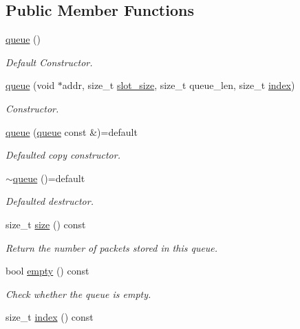 \subsection*{Public Member Functions}
\begin{DoxyCompactItemize}
\item 
\hyperlink{classpfq_1_1queue_a9cae048d6400df0d922d72abaf7b6ed4}{queue} ()
\begin{DoxyCompactList}\small\item\em Default Constructor. \end{DoxyCompactList}\item 
\hyperlink{classpfq_1_1queue_ae22b5277f726ea9b39a4088128d3cc38}{queue} (void $\ast$addr, size\+\_\+t \hyperlink{classpfq_1_1queue_aa8ec2b1bd7c4fb2ec924f356c95b81ae}{slot\+\_\+size}, size\+\_\+t queue\+\_\+len, size\+\_\+t \hyperlink{classpfq_1_1queue_a6eec9332ce5248055b03376855469087}{index})
\begin{DoxyCompactList}\small\item\em Constructor. \end{DoxyCompactList}\item 
\hyperlink{classpfq_1_1queue_a63fb6cb036b494997edceace28b4dfac}{queue} (\hyperlink{classpfq_1_1queue}{queue} const \&)=default
\begin{DoxyCompactList}\small\item\em Defaulted copy constructor. \end{DoxyCompactList}\item 
\hyperlink{classpfq_1_1queue_a2605dcaac04245b5316262a4cf7cd1c0}{$\sim$queue} ()=default
\begin{DoxyCompactList}\small\item\em Defaulted destructor. \end{DoxyCompactList}\item 
size\+\_\+t \hyperlink{classpfq_1_1queue_a367fd68b05da07a1d95f91b8d2ae9990}{size} () const 
\begin{DoxyCompactList}\small\item\em Return the number of packets stored in this queue. \end{DoxyCompactList}\item 
bool \hyperlink{classpfq_1_1queue_ade52977341756f260e8e9f18c0b7b5c5}{empty} () const 
\begin{DoxyCompactList}\small\item\em Check whether the queue is empty. \end{DoxyCompactList}\item 
size\+\_\+t \hyperlink{classpfq_1_1queue_a6eec9332ce5248055b03376855469087}{index} () const 

\end{DoxyCompactItemize}
